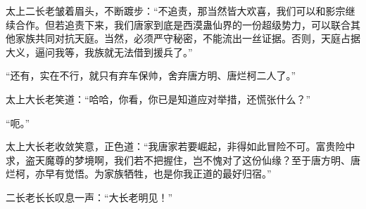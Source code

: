 \begin{this_body}
太上二长老皱着眉头，不断踱步：“不追责，那当然皆大欢喜，我们可以和影宗继续合作。但若追责下来，我们唐家到底是西漠蛊仙界的一份超级势力，可以联合其他家族共同对抗天庭。当然，必须严守秘密，不能流出一丝证据。否则，天庭占据大义，逼问我等，我族就无法借到援兵了。”

“还有，实在不行，就只有弃车保帅，舍弃唐方明、唐烂柯二人了。”

太上大长老笑道：“哈哈，你看，你已是知道应对举措，还慌张什么？”

“呃。”

太上大长老收敛笑意，正色道：“我唐家若要崛起，非得如此冒险不可。富贵险中求，盗天魔尊的梦境啊，我们若不把握住，岂不愧对了这份仙缘？至于唐方明、唐烂柯，亦早有觉悟。为家族牺牲，也是你我正道的最好归宿。”

二长老长长叹息一声：“大长老明见！”

\end{this_body}

